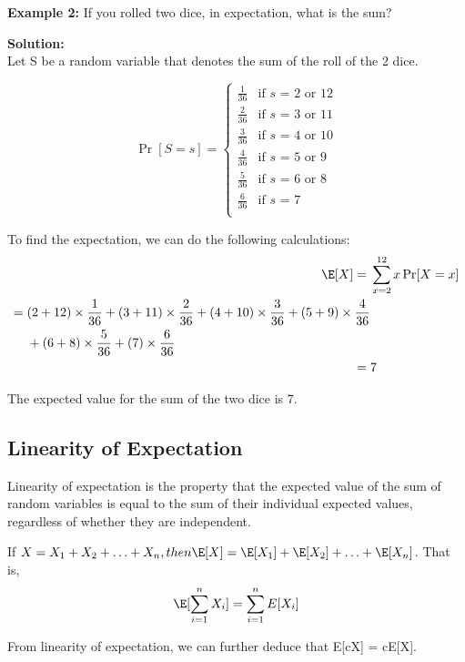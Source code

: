 \textbf{Example 2:}
If you rolled two dice, in expectation, what is the sum?

\vspace{2.5mm}

\textbf{Solution:} \\
Let S be a random variable that denotes the sum of the roll of the 2 dice.

$$
\Pr[S = s] = 
\begin{cases}
\frac{1}{36} & \text{if $s$ = 2 or 12}\\
\frac{2}{36} & \text{if $s$ = 3 or 11}\\
\frac{3}{36} & \text{if $s$ = 4 or 10}\\
\frac{4}{36} & \text{if $s$ = 5 or 9}\\
\frac{5}{36} & \text{if $s$ = 6 or 8}\\
\frac{6}{36} & \text{if $s$ = 7}\\
\end{cases}
$$

To find the expectation, we can do the following calculations:
\begin{align*}
    \E[X] ={}& \sum_{x=2}^{12} x \Pr[X = x] \\
    \begin{split}
        ={}& (2 + 12) \times \frac{1}{36} + (3 + 11) \times \frac{2}{36} + (4 + 10) \times \frac{3}{36} + (5 + 9) \times \frac{4}{36} \\
        & + (6 + 8) \times \frac{5}{36} + (7) \times \frac{6}{36}
    \end{split} \\
    ={}& 7
\end{align*}

The expected value for the sum of the two dice is 7.

\subsection*{Linearity of Expectation}
Linearity of expectation is the property that the expected value of the sum of random variables is equal to the sum of their individual expected values, regardless of whether they are independent.
\begin{theorem}
    If $X = X_{1} + X_{2} + \ldots + X_{n}, then \E[X] = \E[X_{1}] + \E[X_{2}] + \ldots + \E[X_{n}]$. That is,
    \[
    \E[\sum_{i=1}^{n} X_{i}] = \sum_{i=1}^{n} E[X_{i}]
    \]
\end{theorem}
From linearity of expectation, we can further deduce that E[cX] = cE[X].

